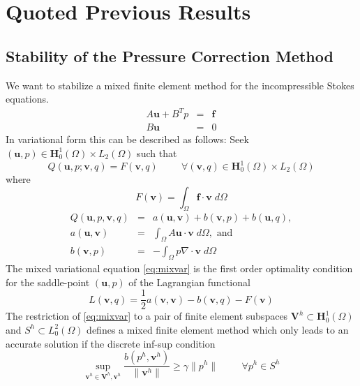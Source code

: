 \documentclass[times]{fldauth}
\newcommand{\mb}{\mathbf}
\begin{document}
\section{Quoted Previous Results} 
\label{chap:prevres}
\subsection{Stability of the Pressure Correction Method}
\label{chap:outline} 
We want to stabilize a mixed finite element method for the incompressible Stokes equations.
\begin{eqnarray}
A \mb u + B^T p 	&=& 	\mb f \\
          B \mb u	&=&	0
\end{eqnarray}
In variational form this can be described as follows:
Seek $(\mb u,p) \in \mb H_0^{1}(\Omega)\times L_2(\Omega)$ such that
\begin{equation}
\label{eq:mixvar}
Q(\mb u,p;\mb v,q)=F(\mb v,q) \hspace{1cm} \forall (\mb v,q) \in \mb H_0^{1}(\Omega)\times L_2(\Omega)
\end{equation}
where
\begin{equation}
F(\mb v) =\int_{\Omega} \mb f \cdot  \mb v \; d\Omega
\end{equation}
\begin{eqnarray}
Q(\mb u,p,\mb v,q) 	&=& a(\mb u,\mb v)+b(\mb v,p)+b(\mb u,q),\\
a(\mb u, \mb v) 	&=& \int_{\Omega} A \mb u \cdot \mb v \; d\Omega, \text{ and } \\
b(\mb v,p) 		&=& - \int_{\Omega} p\nabla \cdot \mb v \; d\Omega
\end{eqnarray}
The mixed variational equation \eqref{eq:mixvar} is the first order optimality condition for the saddle-point $(\mb u, p)$ of the Lagrangian functional
\begin{equation}
\label{eq:lag}
L(\mb v,q) =\frac{1}{2}  a(\mb v,\mb v) -b(\mb v,q)-F(\mb v)
\end{equation}
The restriction of  \eqref{eq:mixvar} to a pair of finite element subspaces $\mb V^h \subset \mb H^1_0 (\Omega) $ and $S^h \subset L^2_0(\Omega)$ defines a mixed finite element method which only leads to an accurate solution if the discrete inf-sup condition 
\begin{equation}
\sup_{\mb v^h \in \mb V^h,\mb v^h }\frac{b(p^h,\mb v^h)}{\|\mb v^h\|} \geq \gamma \|p^h\| \hspace{1cm} \forall p^h \in S^h 
\end{equation}
\end{document}
